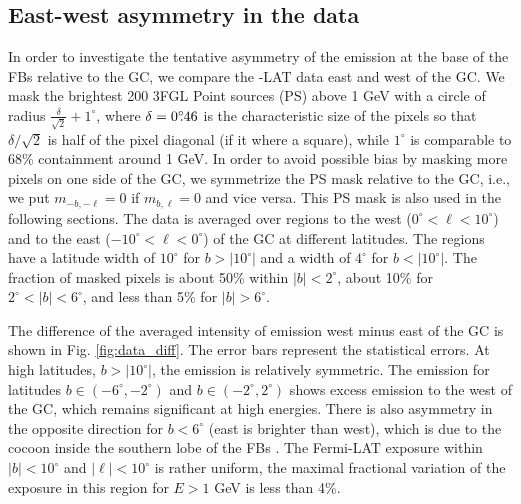 \subsection{East-west  asymmetry in the data}
\label{sec:data_diff}

In order to investigate the tentative asymmetry of the emission at the base of the FBs relative to the GC, 
we compare the \Fermi-LAT data east and west of the GC. 
We mask the brightest 200 3FGL Point sources (PS) above 1 GeV
with a circle of radius $\frac{\delta}{\sqrt{2}} + 1^\circ$, where $\delta = 0^\circ\!\!.46$ is the characteristic size of the pixels
so that ${\delta}/{\sqrt{2}}$ is half of the pixel diagonal (if it where a square), while $1^\circ$ is comparable to 68\% containment
around 1 GeV.
In order to avoid possible bias by masking more pixels on one side of the GC,
we symmetrize the PS mask relative to the GC, i.e., we put $m_{-b, -\ell} = 0$ if $m_{b, \ell} = 0$ and vice versa.
This PS mask is also used in the following sections. 
The data is averaged over regions to the west ($0^\circ < \ell < 10^\circ$) and to the east ($-10^\circ < \ell  <  0^\circ$) 
of the GC at different latitudes. The regions have a latitude width of $10^\circ$ for $b >|10^\circ|$ and a width of  $4^\circ$ for  $b <|10^\circ|$. 
The fraction of masked pixels is about 50\% within $|b| < 2^\circ$, about 10\% for $2^\circ < |b| < 6^\circ$, and less than  5\% 
for $|b| > 6^\circ$.

The difference of the averaged intensity of emission west minus east of the GC is shown in Fig. \ref{fig:data_diff}. 
The error bars represent the statistical errors.
At high latitudes, $b >|10^\circ|$, the emission is relatively symmetric. 
The emission for latitudes $b \in (-6^\circ, -2^\circ)$ and $b \in (-2^\circ, 2^\circ)$ shows excess emission to the west of the GC, 
which remains significant at high energies. 
There is also asymmetry in the opposite direction for $b < 6^\circ$ (east is brighter than west), which is due to the cocoon inside the 
southern lobe of the FBs \citep{2012ApJ...753...61S, 2014ApJ...793...64A}.
The Fermi-LAT exposure within $|b| < 10^\circ$ and $|\ell| < 10^\circ$ is rather uniform, 
the maximal fractional variation of the exposure in this region for $E > 1$ GeV is less than 4\%.

